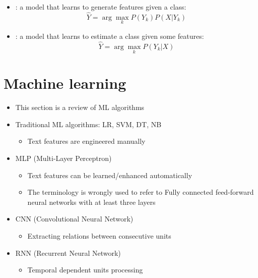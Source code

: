 \documentclass{KBook}
\begin{document}
\begin{itemize}
	\item {}: a model that learns to generate features given a class:
	\[\hat{Y} = \arg\max_k P(Y_k) P(X | Y_k)\]
	
	\item {}: a model that learns to estimate a class given some features: 
	\[\hat{Y} = \arg\max_k P(Y_k | X)\]
\end{itemize}


\section{Machine learning}

	
	\begin{itemize}
		\item This section is a review of ML algorithms
		\item Traditional ML algorithms: LR, SVM, DT, NB
		\begin{itemize}
			\item Text features are engineered manually
		\end{itemize}
		\item MLP (Multi-Layer Perceptron)
		\begin{itemize}
			\item Text features can be learned/enhanced automatically
			\item The terminology is wrongly used to refer to Fully connected feed-forward neural networks with at least three layers
		\end{itemize}
		\item CNN (Convolutional Neural Network)
		\begin{itemize}
			\item Extracting relations between consecutive units
		\end{itemize}
		\item RNN (Recurrent Neural Network)
		\begin{itemize}
			\item Temporal dependent units processing
		\end{itemize}
	\end{itemize}
	
\end{document}
